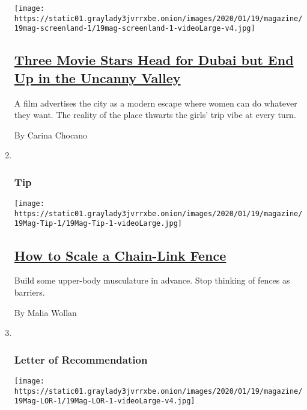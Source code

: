 \begin{enumerate}
  \texttt{[image: https://static01.graylady3jvrrxbe.onion/images/2020/01/19/magazine/19mag-screenland-1/19mag-screenland-1-videoLarge-v4.jpg]}

  \hypertarget{three-movie-stars-head-for-dubai-but-end-up-in-the-uncanny-valley}{%
  \subsection{\texorpdfstring{\href{/2020/01/15/magazine/dubai-gwyneth-paltrow-kate-hudson-zoe-saldana.html}{Three
  Movie Stars Head for Dubai but End Up in the Uncanny
  Valley}}{Three Movie Stars Head for Dubai but End Up in the Uncanny Valley}}\label{three-movie-stars-head-for-dubai-but-end-up-in-the-uncanny-valley}}

  A film advertises the city as a modern escape where women can do
  whatever they want. The reality of the place thwarts the girls' trip
  vibe at every turn.

  By Carina Chocano
\item ~
  \hypertarget{tip}{%
  \subsubsection{Tip}\label{tip}}

  \texttt{[image: https://static01.graylady3jvrrxbe.onion/images/2020/01/19/magazine/19Mag-Tip-1/19Mag-Tip-1-videoLarge.jpg]}

  \hypertarget{how-to-scale-a-chain-link-fence}{%
  \subsection{\texorpdfstring{\href{/2020/01/14/magazine/how-to-scale-a-chain-link-fence.html}{How
  to Scale a Chain-Link
  Fence}}{How to Scale a Chain-Link Fence}}\label{how-to-scale-a-chain-link-fence}}

  Build some upper-body musculature in advance. Stop thinking of fences
  as barriers.

  By Malia Wollan
\item ~
  \hypertarget{letter-of-recommendation}{%
  \subsubsection{Letter of
  Recommendation}\label{letter-of-recommendation}}

  \texttt{[image: https://static01.graylady3jvrrxbe.onion/images/2020/01/19/magazine/19Mag-LOR-1/19Mag-LOR-1-videoLarge-v4.jpg]}


\end{enumerate}
